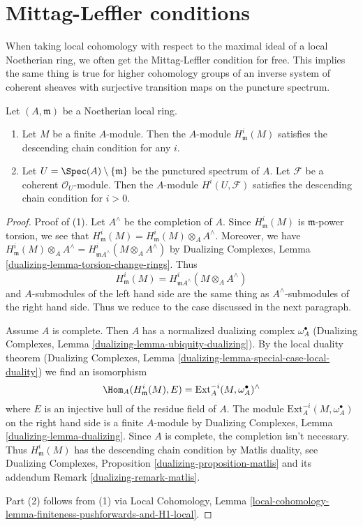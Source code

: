 \section{Mittag-Leffler conditions}
\label{section-ML}

\noindent
When taking local cohomology with respect to the maximal ideal
of a local Noetherian ring, we often get the Mittag-Leffler condition
for free. This implies the same thing is true for higher cohomology
groups of an inverse system of coherent sheaves with surjective transition
maps on the puncture spectrum.

\begin{lemma}
\label{lemma-descending-chain}
Let $(A, \mathfrak m)$ be a Noetherian local ring.
\begin{enumerate}
\item Let $M$ be a finite $A$-module. Then the $A$-module
$H^i_\mathfrak m(M)$ satisfies the descending chain condition
for any $i$.
\item Let $U = \Spec(A) \setminus \{\mathfrak m\}$ be the
punctured spectrum of $A$.
Let $\mathcal{F}$ be a coherent $\mathcal{O}_U$-module.
Then the $A$-module $H^i(U, \mathcal{F})$
satisfies the descending chain condition for $i > 0$.
\end{enumerate}
\end{lemma}

\begin{proof}
Proof of (1). Let $A^\wedge$ be the completion of $A$. Since
$H^i_\mathfrak m(M)$ is $\mathfrak m$-power torsion, we see that
$H^i_\mathfrak m(M) = H^i_\mathfrak m(M) \otimes_A A^\wedge$. Moreover,
we have $H^i_\mathfrak m(M) \otimes_A A^\wedge =
H^i_{\mathfrak mA^\wedge}(M \otimes_A A^\wedge)$ by
Dualizing Complexes, Lemma \ref{dualizing-lemma-torsion-change-rings}.
Thus
$$
H^i_\mathfrak m(M) = H^i_{\mathfrak mA^\wedge}(M \otimes_A A^\wedge)
$$
and $A$-submodules of the left hand side are the same thing as
$A^\wedge$-submodules of the right hand side. Thus we reduce
to the case discussed in the next paragraph.

\medskip\noindent
Assume $A$ is complete. Then $A$ has a normalized dualizing complex
$\omega_A^\bullet$ (Dualizing Complexes, Lemma
\ref{dualizing-lemma-ubiquity-dualizing}).
By the local duality theorem (Dualizing Complexes, Lemma
\ref{dualizing-lemma-special-case-local-duality}) we find an isomorphism
$$
\Hom_A(H^i_\mathfrak m(M), E) =
\text{Ext}^{-i}_A(M, \omega_A^\bullet)^\wedge
$$
where $E$ is an injective hull of the residue field of $A$. The module
$\text{Ext}^{-i}_A(M, \omega_A^\bullet)$
on the right hand side is a finite $A$-module by
Dualizing Complexes, Lemma \ref{dualizing-lemma-dualizing}.
Since $A$ is complete, the completion isn't necessary.
Thus $H^i_\mathfrak m(M)$ has the descending chain condition
by Matlis duality, see 
Dualizing Complexes, Proposition \ref{dualizing-proposition-matlis}
and its addendum Remark \ref{dualizing-remark-matlis}.

\medskip\noindent
Part (2) follows from (1) via Local Cohomology,
Lemma \ref{local-cohomology-lemma-finiteness-pushforwards-and-H1-local}.
\end{proof}

